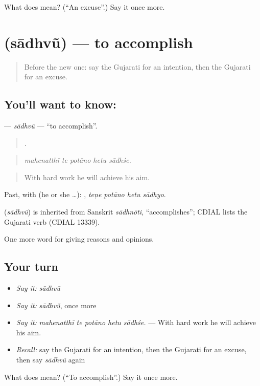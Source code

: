 \begin{tcolorbox}[breakable,colback=teal!4,colframe=teal!35!black,title={Before you move on}]
What does  mean? (\textquotedblleft{}An excuse\textquotedblright{}.) Say it once more.
\end{tcolorbox}
\section[\texorpdfstring{\gu{સાધવું} (sādhvũ)}{સાધવું (sādhvũ)}]{ (sādhvũ) — to accomplish}

\label{lesson:GU-C340-sadhvu}



\begin{quote}
Before the new one: say the Gujarati for an intention, then the Gujarati for an excuse.
\end{quote}

\subsection*{You'll want to know: }
\textbf{} — \emph{sādhvũ} — \textquotedblleft{}to accomplish\textquotedblright{}.

\begin{quote}
    .
\end{quote}

\begin{quote}
\emph{mahenatthī te potāno hetu sādhśe.}
\end{quote}

\begin{quote}
With hard work he will achieve his aim.
\end{quote}

Past, with  (he or she …):    , \emph{teṇe potāno hetu sādhyo}.

\begin{cousinweb}
\textbf{} (\emph{sādhvũ}) is inherited from Sanskrit \emph{sādhnōti}, \textquotedblleft{}accomplishes\textquotedblright{}; CDIAL lists the Gujarati verb (CDIAL 13339).
\end{cousinweb}

\begin{grammarlens}[title={What you've built}]
One more word for giving reasons and opinions.
\end{grammarlens}

\subsection*{Your turn}
\begin{itemize}
\raggedright
  \item \emph{Say it:} \emph{sādhvũ}
  \item \emph{Say it:} \emph{sādhvũ}, once more
  \item \emph{Say it:} \emph{mahenatthī te potāno hetu sādhśe.} — With hard work he will achieve his aim.
  \item \emph{Recall:} say the Gujarati for an intention, then the Gujarati for an excuse, then say \emph{sādhvũ} again
\end{itemize}

\begin{tcolorbox}[breakable,colback=teal!4,colframe=teal!35!black,title={Before you move on}]
What does  mean? (\textquotedblleft{}To accomplish\textquotedblright{}.) Say it once more.
\end{tcolorbox}

